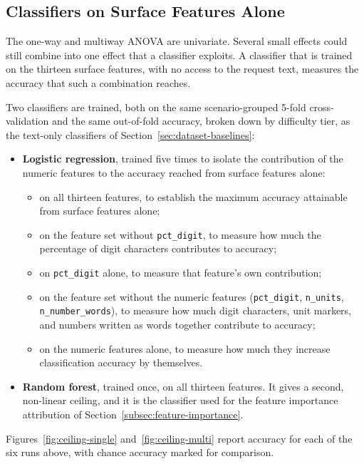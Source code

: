 \flushbottom

\subsection{Classifiers on Surface Features Alone}
\label{subsec:shortcut-classifiers}

The one-way and multiway ANOVA are univariate. Several small effects could still combine into one effect that a classifier exploits. A classifier that is trained on the thirteen surface features, with no access to the request text, measures the accuracy that such a combination reaches.

Two classifiers are trained, both on the same scenario-grouped 5-fold cross-validation and the same out-of-fold accuracy, broken down by difficulty tier, as the text-only classifiers of Section~\ref{sec:dataset-baselines}:

\begin{itemize}
    \item \textbf{Logistic regression}, trained five times to isolate the contribution of the numeric features to the accuracy reached from surface features alone:
    \begin{itemize}
        \item on all thirteen features, to establish the maximum accuracy attainable from surface features alone;
        \item on the feature set without \texttt{pct\_digit}, to measure how much the percentage of digit characters contributes to accuracy;
        \item on \texttt{pct\_digit} alone, to measure that feature's own contribution;
        \item on the feature set without the numeric features (\texttt{pct\_digit}, \texttt{n\_units}, \texttt{n\_number\_words}), to measure how much digit characters, unit markers, and numbers written as words together contribute to accuracy;
        \item on the numeric features alone, to measure how much they increase classification accuracy by themselves.
    \end{itemize}
    \item \textbf{Random forest}, trained once, on all thirteen features. It gives a second, non-linear ceiling, and it is the classifier used for the feature importance attribution of Section~\ref{subsec:feature-importance}.
\end{itemize}

Figures~\ref{fig:ceiling-single} and~\ref{fig:ceiling-multi} report accuracy for each of the six runs above, with chance accuracy marked for comparison.

